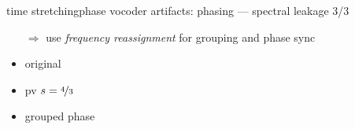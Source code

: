 	\begin{frame}{time stretching}{phase vocoder artifacts: phasing --- spectral leakage 3/3}
                \begin{itemize}
                    \item[$\Rightarrow$] use \textit{frequency reassignment} for grouping and phase sync
                \end{itemize}
                \bigskip
                        \begin{itemize}
                            \item   original  
                            \item   pv $s = \nicefrac{4}{3}$ 
                            \item   grouped phase 
                        \end{itemize}
    \end{frame}
